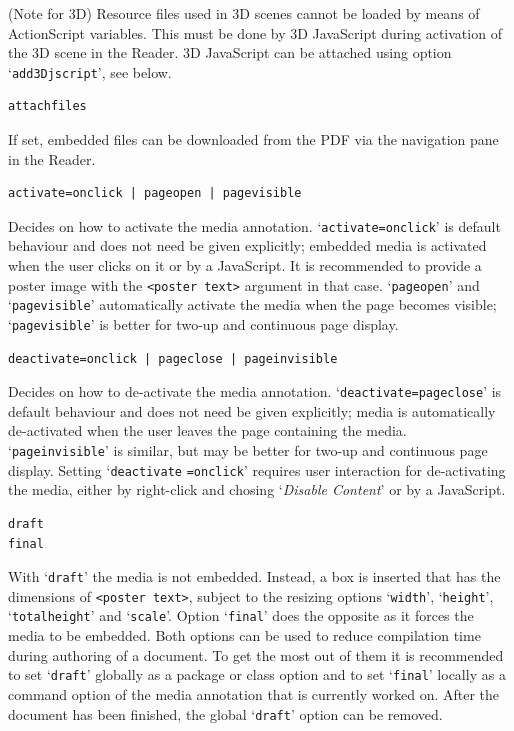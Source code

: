 \documentclass[a4paper]{article}
\begin{document}
(Note for 3D) Resource files used in 3D scenes cannot be loaded by means of ActionScript variables. This must be done by 3D JavaScript during activation of the 3D scene in the Reader. 3D JavaScript can be attached using option `\verb+add3Djscript+', see below.
\begin{verbatim}
attachfiles
\end{verbatim}
If set, embedded files can be downloaded from the PDF via the  navigation pane in the Reader.
\begin{verbatim}
activate=onclick | pageopen | pagevisible
\end{verbatim}
Decides on how to activate the media annotation. `\verb+activate=onclick+' is default behaviour and does not need be given explicitly; embedded media is activated when the user clicks on it or by a JavaScript. It is recommended to provide a poster image with the \verb+<poster text>+ argument in that case. `\verb+pageopen+' and `\verb+pagevisible+' automatically activate the media when the page becomes visible; `{\tt pagevisible}' is better for two-up and continuous page display.
\begin{verbatim}
deactivate=onclick | pageclose | pageinvisible
\end{verbatim}
Decides on how to de-activate the media annotation. `\verb+deactivate=pageclose+' is default behaviour and does not need be given explicitly; media is automatically de-activated when the user leaves the page containing the media. `\verb+pageinvisible+' is similar, but may be better for two-up and continuous page display. Setting `\verb+deactivate+ \verb+=onclick+' requires user interaction for de-activating the media, either by right-click and chosing `\emph{\sffamily Disable Content}' or by a JavaScript.
\hypertarget{draftfinal}{}%
\begin{verbatim}
draft
final
\end{verbatim}
With `\verb+draft+' the media is not embedded. Instead, a box is inserted that has the dimensions of \verb+<poster text>+, subject to the resizing options `\verb+width+', `\verb+height+', `\verb+totalheight+' and `\verb+scale+'. Option `\verb+final+' does the opposite as it forces the media to be embedded. Both options can be used to reduce compilation time during authoring of a document. To get the most out of them it is recommended to set `\verb+draft+' globally as a package or class option and to set `\verb+final+' locally as a command option of the media annotation that is currently worked on. After the document has been finished, the global `\verb+draft+' option can be removed.
\end{document}
